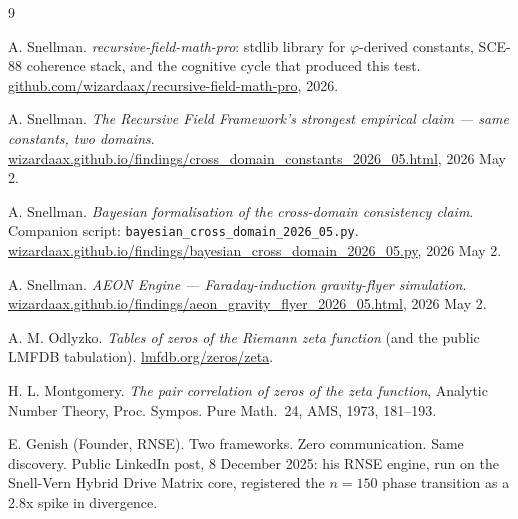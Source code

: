 \documentclass[11pt,a4paper]{article}
\begin{document}
\begin{thebibliography}{9}

A. Snellman.
\emph{recursive-field-math-pro}: stdlib library for $\varphi$-derived constants,
SCE-88 coherence stack, and the cognitive cycle that produced this test.
\href{https://github.com/wizardaax/recursive-field-math-pro}{github.com/wizardaax/recursive-field-math-pro}, 2026.

A. Snellman.
\emph{The Recursive Field Framework's strongest empirical claim — same
constants, two domains}.
\href{https://wizardaax.github.io/findings/cross_domain_constants_2026_05.html}{wizardaax.github.io/findings/cross\_domain\_constants\_2026\_05.html}, 2026 May 2.

A. Snellman.
\emph{Bayesian formalisation of the cross-domain consistency claim}.
Companion script: \texttt{bayesian\_cross\_domain\_2026\_05.py}.
\href{https://wizardaax.github.io/findings/bayesian_cross_domain_2026_05.py}{wizardaax.github.io/findings/bayesian\_cross\_domain\_2026\_05.py}, 2026 May 2.

A. Snellman.
\emph{AEON Engine — Faraday-induction gravity-flyer simulation}.
\href{https://wizardaax.github.io/findings/aeon_gravity_flyer_2026_05.html}{wizardaax.github.io/findings/aeon\_gravity\_flyer\_2026\_05.html}, 2026 May 2.

A. M. Odlyzko.
\emph{Tables of zeros of the Riemann zeta function} (and the public
LMFDB tabulation).
\href{https://www.lmfdb.org/zeros/zeta/}{lmfdb.org/zeros/zeta}.

H. L. Montgomery.
\emph{The pair correlation of zeros of the zeta function},
Analytic Number Theory, Proc. Sympos. Pure Math.\ 24, AMS, 1973, 181--193.

E. Genish (Founder, RNSE).
Two frameworks. Zero communication. Same discovery.
Public LinkedIn post, 8 December 2025: his RNSE engine, run on the
Snell-Vern Hybrid Drive Matrix core, registered the $n=150$ phase
transition as a 2.8x spike in divergence.

\end{thebibliography}

\appendix
\end{document}
